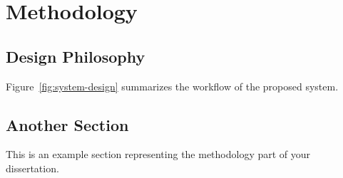 \chapter{Methodology}
\label{chap:methodology}


\section{Design Philosophy}
Figure~\ref{fig:system-design} summarizes the workflow of the proposed system.



\section{Another Section}
This is an example section representing the methodology part of your dissertation.
